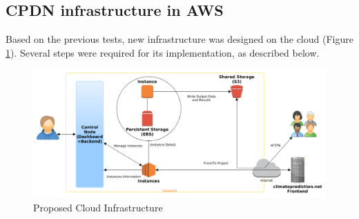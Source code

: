 \documentclass[journal abbreviation, manuscript]{copernicus}
\begin{document}
\subsection{CPDN infrastructure in AWS}
\label{section:cpdn_infrastructure}

Based on the previous tests, new infrastructure was designed on the cloud (Figure \ref{fig:cloudinfra}). Several steps were required for its implementation, as described below.

\begin{figure}[h!]
\centering
\includegraphics[width=6.5in]{images/cloud_infrastructure}
\caption{Proposed Cloud Infrastructure}
\label{fig:cloudinfra}
\end{figure}
\end{document}
